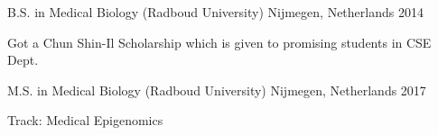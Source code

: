 

\begin{cventries}

  \cventry
    {B.S. in Medical Biology} %
    (Radboud University) %
    {Nijmegen, Netherlands} %
    {2014} %
    {
      \begin{cvitems} %
        \item {Got a Chun Shin-Il Scholarship which is given to promising students in CSE Dept.}
      \end{cvitems}
    }
  \cventry
    {M.S. in Medical Biology} %
    (Radboud University) %
    {Nijmegen, Netherlands} %
    {2017} %
    {
      \begin{cvitems} %
        \item {Track: Medical Epigenomics}
      \end{cvitems}
    }


\end{cventries}
